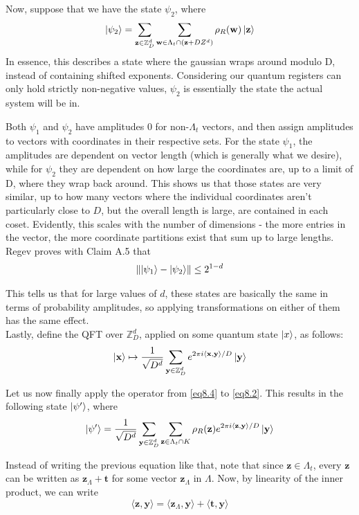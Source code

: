 Now, suppose that  we have the state $\psi_2$, where
\begin{equation}
   \ket{\psi_2} = \sum_{\mathbf{z} \in \mathbb{Z}^d_D} \sum_{\mathbf{w} \in \Lambda_t \cap (\mathbf{z} + DZ^d)}{\rho_R(\mathbf{w}) \ket{\mathbf{z}}}
\end{equation}
In essence, this describes a state where the gaussian wraps around modulo D, instead of containing shifted exponents. Considering our quantum registers can only hold strictly non-negative values, $\psi_2$ is essentially the state the actual system will be in.

Both $\psi_1$ and $\psi_2$ have amplitudes 0 for non-$\Lambda_t$ vectors, and then assign amplitudes to vectors with coordinates in their respective sets. For the state $\psi_1$, the amplitudes are dependent on vector length (which is generally what we desire), while for $\psi_2$ they are dependent on how large the coordinates are, up to a limit of D, where they wrap back around. This shows us that those states are very similar, up to how many vectors where the individual coordinates aren't particularly close to $D$, but the overall length is large, are contained in each coset. Evidently, this scales with the number of dimensions - the more entries in the vector, the more coordinate partitions exist that sum up to large lengths. Regev proves with Claim A.5 that $$\lVert\ket{\psi_1} - \ket{\psi_2} \rVert \leq 2^{1-d}$$

This tells us that for large values of $d$, these states are basically the same in terms of probability amplitudes, so applying transformations on either of them has the same effect.\\

Lastly, define the QFT over $\mathbb{Z}^d_D$, applied on some quantum state $\ket{x}$, as follows:
\begin{equation}
    \ket{\mathbf{x}} \mapsto \frac{1}{\sqrt{D^d}} \sum_{\mathbf{y} \in \mathbb{Z}^d_D} e^{2\pi i \langle \mathbf{x,y} \rangle /D} \ket{\mathbf{y}}
    \label{eq8.4}
\end{equation}

Let us now finally apply the operator from \eqref{eq8.4} to \eqref{eq8.2}. This results in the following state $\ket{\psi'}$, where
$$\ket{\psi'} = \frac{1}{\sqrt{D^d}} \sum_{\mathbf{y} \in \mathbb{Z}^d_D} \sum_{\mathbf{z} \in \Lambda_t \cap K} \rho_R(\mathbf{z}) e^{2\pi i \langle \mathbf{z},\mathbf{y} \rangle / D} \ket{\mathbf{y}}$$

Instead of writing the previous equation like that, note that since $\mathbf{z} \in \Lambda_t$, every $\mathbf{z}$ can be written as $\mathbf{z}_\Lambda + \mathbf{t}$ for some vector $\mathbf{z}_\Lambda$ in $\Lambda$. Now, by linearity of the inner product, we can write $$\langle \mathbf{z},\mathbf{y} \rangle = \langle \mathbf{z}_\Lambda,\mathbf{y} \rangle + \langle \mathbf{t},\mathbf{y} \rangle$$ 

